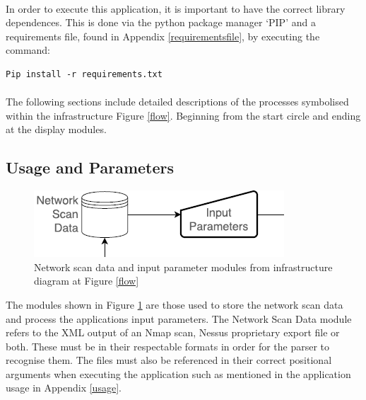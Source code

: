 \paragraph{}In order to execute this application, it is important to have the correct library dependences. This is done via the python package manager ‘PIP' and a requirements file, found in Appendix \ref{requirementsfile}, by executing the command:
\lstset{language=Python}
\begin{lstlisting}
Pip install -r requirements.txt
\end{lstlisting}

\paragraph{}The following sections include detailed descriptions of the processes symbolised within the infrastructure Figure \ref{flow}.  Beginning from the start circle and ending at the display modules.\linebreak

\subsection{Usage and Parameters}
\label{infra1}

\begin{figure}[!h]
\centering
\includegraphics{./Figures/infra1.png}
\caption{Network scan data and input parameter modules from infrastructure diagram at Figure \ref{flow}}
\label{infra1}
\end{figure}

The modules shown in Figure \ref{infra1} are those used to store the network scan data and process the applications input parameters. The Network Scan Data module refers to the XML output of an Nmap scan, Nessus proprietary export file or both. These must be in their respectable formats in order for the parser to recognise them. The files must also be referenced in their correct positional arguments when executing the application such as mentioned in the application usage in Appendix \ref{usage}.

